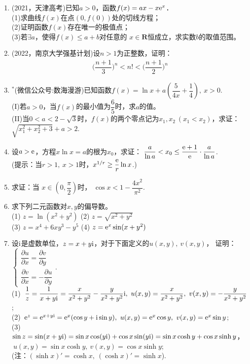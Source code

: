 \begin{enumerate}[label={\textbf{\arabic*.}},leftmargin=
    \inteval{\myenumleftmargin}pt]
\item (2021，天津高考)已知$ a>0 $，函数$ f(x)=ax-x\mathrm{e}^x $．\\
(1)求曲线$ f(x) $在点$ (0,f(0)) $处的切线方程；\\
(2)证明函数$ f(x) $存在唯一的极值点；\\
(3)若$ \exists a $，使得$ f(x)\leq a+b $对任意的
$ x\in \textbf{R} $恒成立，求实数$ b $的取值范围。

\item (2022，南京大学强基计划)设$n>1$为正整数，证明：
\begin{align*}
    \Big(\dfrac{n+1}{3}\Big)^{n}<n!<\Big(\dfrac{n+1}{2}\Big)^{n}
\end{align*}

\item $ ^* $(微信公众号:数海漫游)已知函数$ f(x)=\ln x+a\left(\dfrac{5}{4x}+\dfrac{1}{4}\right),\ x>0 $.\\
(I)若$ a>0 $，当$ f(x) $的最小值为$ \dfrac{6}{5} $时，求$ a $的值。\\
(II)当$ 0<a<2-\sqrt{3} $时，$ f(x) $的两个零点记为$ x_1,x_2\ (x_1<x_2) $，求证：$ \sqrt{x_1^2+x_2^2+3}+a>2 $.

\item 设$ a>\mathrm{e} $，方程$ x\ln x=a $的根为$ x_0 $，求证：
$ \dfrac{a}{\ln a}<x_0\leq \dfrac{\mathrm{e}+1}{\mathrm{e}}\cdot \dfrac{a}{\ln a} $. \\
(提示：当$ r>1,\ x>1 $时，$ x^{1/r}\geq \dfrac{\mathrm{e}}{r}\ln x $.)

\item 求证：当 $ x\in \left(0,\dfrac{\pi}{2}\right) $时，
$ \cos x<1-\dfrac{4x^2}{\pi^2} $.

\item 求下列二元函数对$ x,y $的偏导数。\\
(1) $ z=\ln(x^2+y^2) $ \quad (2) $ z=\sqrt{x^2+y^2} $ \\
(3) $ z=x^4+6xy^3-y^5 $ \quad (4) $ z=\mathrm{e}^x\sin(x+y^2)  $ 

\item 设$ \mathrm{i} $是虚数单位，$ z=x+ y\mathrm{i} $，对于下面定义的$ u(x,y),\ v(x,y) $，
证明：$ \begin{cases}
    \dfrac{\partial u}{\partial x} =\dfrac{\partial v}{\partial y} \\
    \dfrac{\partial v}{\partial x} =-\dfrac{\partial u}{\partial y} 
\end{cases} $. \\
(1)\ $ \dfrac{1}{z}=\dfrac{1}{x+y\mathrm{i}}=\dfrac{x}{x^2+y^2}-\dfrac{y}{x^2+y^2}\mathrm{i},
\ u(x,y)=\dfrac{x}{x^2+y^2},\ v(x,y)=-\dfrac{y}{x^2+y^2} $; \\
(2)\ $ \e^{z}=\e^{x+y\i}=\e^x(\cos y+\i\sin y),\ u(x,y)=\e^x \cos y,
\ v(x,y)=\e^x\sin y $; \\
(3)\ $ \sin z=\sin(x+y\mathrm{i})=\sin x\cos(y\mathrm{i})+\cos x\sin(y\mathrm{i})=\sin x\cosh y+
\cos x\sinh y $， \\ $\ u(x,y)=\sin x\cosh y,\ v(x,y)=\cos x\sinh y $; \\
(注：$ (\sinh x)'=\cosh x,\ (\cosh x)'=\sinh x $). 


\end{enumerate}
